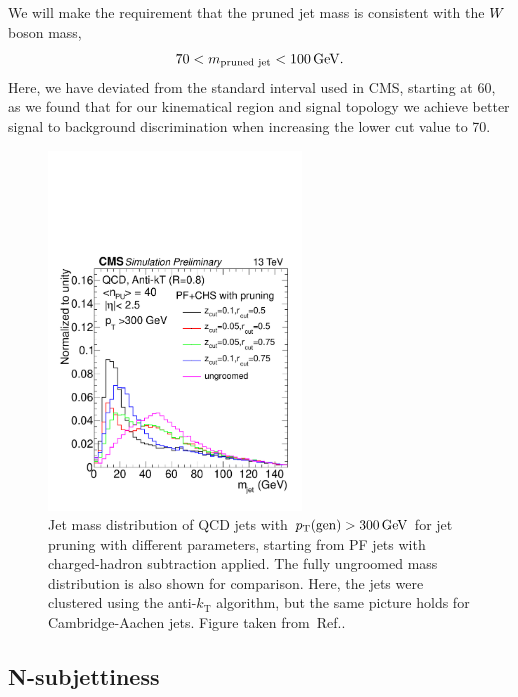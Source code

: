 We will make the requirement that the pruned jet mass is consistent with the $W$ boson mass,
\begin{equation}
  70 < m_{\textrm{pruned jet}} < 100 \,\text{Ge\hspace{-.08em}V} .
\end{equation}
Here, we have deviated from the standard interval used in CMS, starting at 60\GeV, as we found that
for our
kinematical region and signal topology we achieve better signal to background discrimination when
increasing the lower cut value to 70\GeV. 

\begin{figure}
  \centering
  \includegraphics[width=0.6\textwidth]{figures/razor_wtag/1DPFCHS_PR_QCD}
  \caption{Jet mass distribution of QCD jets with $p_{\mathrm{T}}(\textrm{gen}) > 300 \,\text{Ge\hspace{-.08em}V}$ for jet pruning
with different parameters, starting from PF jets with charged-hadron subtraction applied. The fully
ungroomed mass distribution is also shown for comparison. Here, the jets were clustered using the
anti-$k_\mathrm{T}$ algorithm, but the same picture holds for Cambridge-Aachen jets.
Figure taken from~Ref.\cite{CMS-PAS-JME-14-001}. 
  \label{fig:wtag_jet_pruning}}
\end{figure}


\subsection{N-subjettiness}

